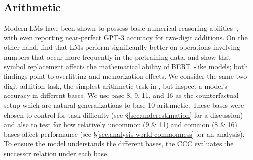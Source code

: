 \subsection{Arithmetic} \label{sec:math-task}

Modern LMs have been shown to possess basic numerical reasoning abilities~\citep{lewkowycz2022solving}, with \citet{gpt3} even reporting near-perfect GPT-3 accuracy for two-digit additions. On the other hand, \citet{razeghi-etal-2022-impact} find that LMs perform significantly better on operations involving numbers that occur more frequently in the pretraining data, and \citet{li-etal-2023-bert} show that symbol replacement affects the mathematical ability of BERT~\citep{devlin2019bert}-like models; both findings point to overfitting and memorization effects. We consider the same two-digit addition task, the simplest arithmetic task in \citet{gpt3}, but inspect a model's accuracy in different bases. We use base-8, 9, 11, and 16 as the counterfactual setup which are natural generalizations to base-10 arithmetic. These bases were chosen to control for task difficulty (see \S\ref{sec:underestimation} for a discussion) and also to test for how relatively uncommon (9 \& 11) and common (8 \& 16) bases affect performance (see \S\ref{sec:analysis-world-commonness} for an analysis).
To ensure the model understands the different bases, the CCC evaluates the successor relation under each base.
